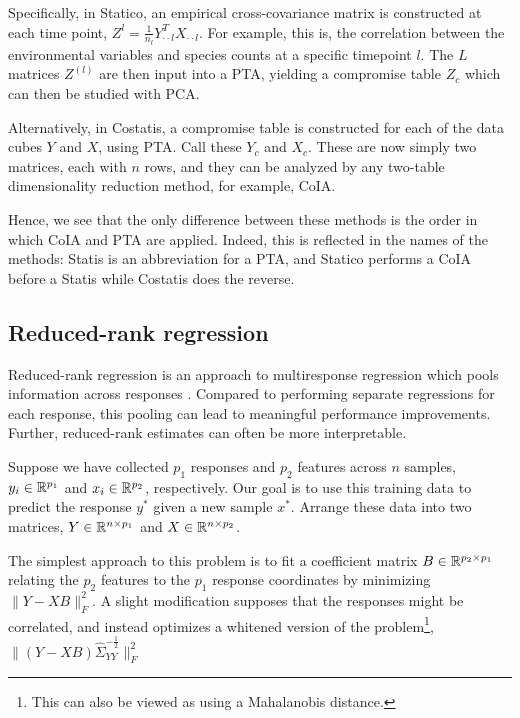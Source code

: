 \documentclass{article}
\begin{document}
Specifically, in Statico, an empirical cross-covariance matrix is constructed at
each time point, $Z^{l} = \frac{1}{n_{l}}Y^{T}_{\cdot\cdot l}X_{\cdot \cdot l}$.
For example, this is, the correlation between the environmental variables and
species counts at a specific timepoint $l$. The $L$ matrices $Z^{(l)}$ are then
input into a PTA, yielding a compromise table $Z_{c}$ which can then be studied
with PCA.

Alternatively, in Costatis, a compromise table is constructed for each of the
data cubes $Y$ and $X$, using PTA. Call these $Y_{c}$ and $X_{c}$. These are now
simply two matrices, each with $n$ rows, and they can be analyzed by any
two-table dimensionality reduction method, for example, CoIA.

Hence, we see that the only difference between these methods is the order in
which CoIA and PTA are applied. Indeed, this is reflected in the names of the
methods: Statis is an abbreviation for a PTA, and Statico performs a CoIA before
a Statis while Costatis does the reverse.

\subsection{Reduced-rank regression}
\label{subsec:label}

Reduced-rank regression is an approach to multiresponse regression which pools
information across responses \citep{izenman1975reduced, mukherjee2011reduced}.
Compared to performing separate regressions for each response, this pooling can
lead to meaningful performance improvements. Further, reduced-rank estimates can
often be more interpretable.

Suppose we have collected $p_{1}$ responses and $p_{2}$ features across $n$
samples, $y_{i} \in \mathbb{R}^{p_{1}}$ and $x_{i} \in \mathbb{R}^{p_{2}}$,
respectively. Our goal is to use this training data to predict the response
$y^{\ast}$ given a new sample $x^{\ast}$. Arrange these data into two matrices,
$Y \in \mathbb{R}^{n \times p_{1}}$ and $X \in \mathbb{R}^{n \times p_{2}}$.

The simplest approach to this problem is to fit a coefficient matrix $B \in
\mathbb{R}^{p_{2} \times p_{1}}$ relating the $p_{2}$ features to the $p_{1}$
response coordinates by minimizing $\|Y - XB\|_{F}^{2}$. A slight modification
supposes that the responses might be correlated, and instead optimizes a
whitened version of the problem\footnote{This can also be viewed as using a
  Mahalanobis distance.}, $\|\left(Y -
XB\right)\hat{\Sigma}_{YY}^{-\frac{1}{2}}\|_{F}^{2}$
\end{document}
